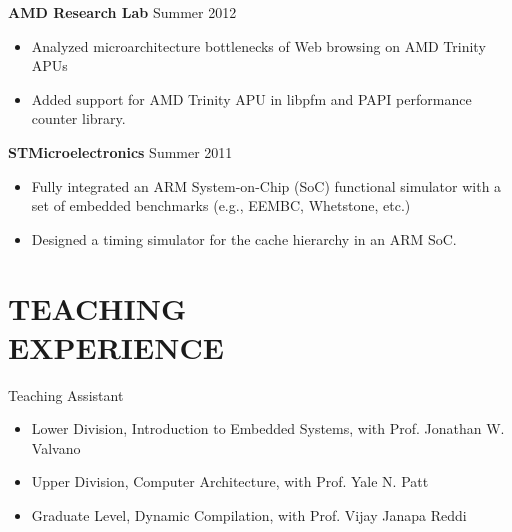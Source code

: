 \documentclass[margin, 9pt]{res} %
\begin{document}
\begin{resume}
\medskip
{\textbf{AMD Research Lab}} \hfill{Summer 2012}\\
\vspace*{-10pt}
\begin{itemize}[leftmargin=*] \itemsep -3pt
\vspace*{-5pt}
	\item Analyzed microarchitecture bottlenecks of Web browsing on AMD Trinity APUs
	\item Added support for AMD Trinity APU in libpfm and PAPI performance counter library.
\end{itemize}

\medskip
{\textbf{STMicroelectronics}} \hfill{Summer 2011}\\
\vspace*{-10pt}
\begin{itemize}[leftmargin=*] \itemsep -3pt
\vspace*{-5pt}
	\item Fully integrated an ARM System-on-Chip (SoC) functional simulator with a set of embedded benchmarks (e.g., EEMBC, Whetstone, etc.)
	\item Designed a timing simulator for the cache hierarchy in an ARM SoC.
\end{itemize}


\section{TEACHING\\ EXPERIENCE} 

{\large{Teaching Assistant}}\\
\vspace*{-5pt}
\begin{itemize}[leftmargin=*] \itemsep -2pt
\vspace*{-5pt}
	\item Lower Division, Introduction to Embedded Systems, with Prof. Jonathan W. Valvano
	\item Upper Division, Computer Architecture, with Prof. Yale N. Patt
	\item Graduate Level, Dynamic Compilation, with Prof. Vijay Janapa Reddi
\end{itemize}



\end{resume}
\end{document}
